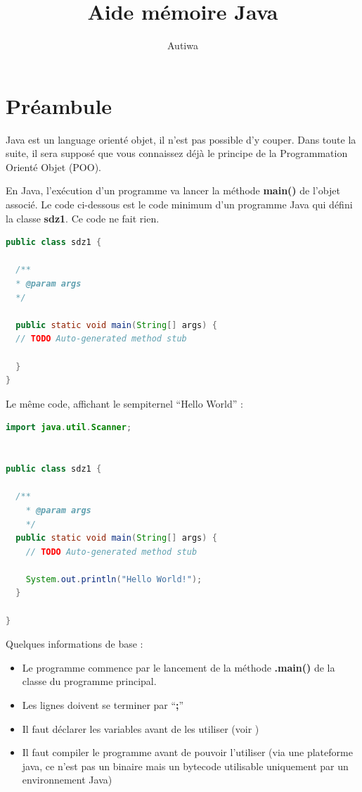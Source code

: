 \documentclass[a4paper,twoside]{article}
\title{Aide mémoire Java}
\author{Autiwa}
\begin{document}
\tableofcontents

\clearpage

\section{Préambule}
Java est un language orienté objet, il n'est pas possible d'y couper. Dans toute la suite, il sera supposé que vous connaissez déjà le principe de la Programmation Orienté Objet (POO). 

En Java, l'exécution d'un programme va lancer la méthode \textbf{main()} de l'objet associé. Le code ci-dessous est le code minimum d'un programme Java qui défini la classe \textbf{sdz1}. Ce code ne fait rien. 
\begin{lstlisting}[language=java]
public class sdz1 {

  /**
  * @param args
  */

  public static void main(String[] args) {
  // TODO Auto-generated method stub

  }
}
\end{lstlisting}

Le même code, affichant le sempiternel ``Hello World'' : 
\begin{lstlisting}[language=java]
import java.util.Scanner;


public class sdz1 {

  /**
    * @param args
    */
  public static void main(String[] args) {
    // TODO Auto-generated method stub
    
    System.out.println("Hello World!");
  }

}
\end{lstlisting}

Quelques informations de base : 
\begin{itemize}
\item Le programme commence par le lancement de la méthode \textbf{.main()} de la classe du programme principal.%
\item Les lignes doivent se terminer par ``\textbf{;}''
\item Il faut déclarer les variables avant de les utiliser (voir )
\item Il faut compiler le programme avant de pouvoir l'utiliser (via une plateforme java, ce n'est pas un binaire mais un bytecode utilisable uniquement par un environnement Java)
\end{itemize}
\end{document}
